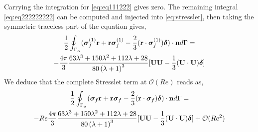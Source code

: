 Carrying the integration for  \ref{eq:eq111222} gives zero. 
The remaining integral \eqref{eq:eq222222222} can be computed and injected into \ref{eq:stresslet}, then taking the symmetric traceless part of the equation gives, 
\begin{multline}
    \frac{1}{2}\oint_{\Gamma_{\alpha}} (\bm\sigma_f^{(1)} \textbf{r} + \textbf{r} \bm\sigma_f^{(1)} -\frac{2}{3}(\textbf{r} \cdot \bm\sigma_f^{(1)} )\bm\delta)\cdot \textbf{n} d\Gamma
    = \\
    - \frac{4\pi}{3}\frac{63 \lambda^{3} + 150 \lambda^{2} + 112 \lambda + 28}{80 \left(\lambda + 1\right)^{3}}
    [
        \textbf{UU} - \frac{1}{3}(\textbf{U}\cdot \textbf{U})\bm\delta 
    ]
\end{multline}
We deduce that the complete Stresslet term at $\mathcal{O}(Re)$ reads as, 
\begin{multline}
    \frac{1}{2}\intS{(\bm\sigma_f \textbf{r} + \textbf{r} \bm\sigma_f -\frac{2}{3}(\textbf{r} \cdot \bm\sigma_f )\bm\delta)\cdot \textbf{n}}
    = \\
    - Re \frac{4\pi}{3}\frac{63 \lambda^{3} + 150 \lambda^{2} + 112 \lambda + 28}{80 \left(\lambda + 1\right)^{3}}
    [
        \textbf{UU} - \frac{1}{3}(\textbf{U}\cdot \textbf{U})\bm\delta 
    ]
    + \mathcal{O}(Re^2)
    \label{eq:sol}
\end{multline}


 

